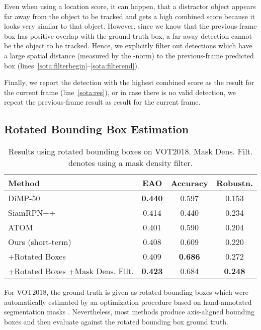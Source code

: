 \documentclass[10pt,twocolumn,letterpaper]{article}
\begin{document}
Even when using a location score, it can happen, that a distractor object appears far away from the object to be tracked and gets a high combined score because it looks very similar to that object. However, since we know that the previous-frame box has positive overlap with the ground truth box, a far-away detection cannot be the object to be tracked.
Hence, we explicitly filter out detections which have a large spatial distance (measured by the -norm) to the previous-frame predicted box (lines~\ref{sota:filterbegin}--\ref{sota:filterend}).

Finally, we report the detection with the highest combined score as the result for the current frame (line~\ref{sota:res}), or in case there is no valid detection, we repeat the previous-frame result as result for the current frame.

\subsection{Rotated Bounding Box Estimation}
\begin{table}
\begin{centering}
\setlength{\tabcolsep}{3pt}
\begin{tabular}{lccc}
\toprule 
{\footnotesize{}Method} & {\footnotesize{}EAO } & {\footnotesize{}Accuracy } & {\footnotesize{}Robustn. }\tabularnewline
\midrule 
{\footnotesize{}DiMP-50 \cite{Bhat19ICCV}} & \textbf{\footnotesize{}0.440} & {\footnotesize{}0.597} & {\footnotesize{}0.153}\tabularnewline
{\footnotesize{}SiamRPN++ \cite{Li19CVPR}} & {\footnotesize{}0.414} & {\footnotesize{}0.440} & {\footnotesize{}0.234}\tabularnewline
{\footnotesize{}ATOM \cite{Danelljan19CVPR}} & {\footnotesize{}0.401} & {\footnotesize{}0.590} & {\footnotesize{}0.204}\tabularnewline
\midrule
{\footnotesize{}Ours (short-term)} & {\footnotesize{}0.408} & {\footnotesize{}0.609} & {\footnotesize{}0.220}\tabularnewline
{\footnotesize{}+Rotated Boxes} & {\footnotesize{}0.409} & \textbf{\footnotesize{}0.686} & {\footnotesize{}0.272}\tabularnewline
{\footnotesize{}+Rotated Boxes +Mask Dens. Filt.} & \textbf{\footnotesize{}0.423} & {\footnotesize{}0.684} & \textbf{\footnotesize{}0.248}\tabularnewline
\bottomrule
\end{tabular}\caption{\label{tab:rotated-bboxes} Results using rotated bounding boxes on VOT2018. Mask Dens. Filt. denotes using a mask density filter.}
\par\end{centering}
\end{table}
For VOT2018, the ground truth is given as rotated bounding boxes which were automatically estimated by an optimization procedure based on hand-annotated segmentation masks \cite{Kristan16ECCVW}. Nevertheless, most methods produce axis-aligned bounding boxes and then evaluate against the rotated bounding box ground truth. 
\end{document}
